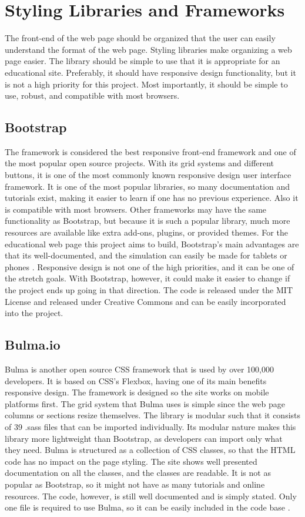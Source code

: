 \documentclass[capstone.tex]{subfiles}
\begin{document}
\section{Styling Libraries and Frameworks}
The front-end of the web page should be organized that the user can easily understand the format of the web page. Styling libraries make organizing a web page easier. The library should be simple to use that it is appropriate for an educational site. Preferably, it should have responsive design functionality, but it is not a high priority for this project. Most importantly, it should be simple to use, robust, and compatible with most browsers.

\subsection{Bootstrap}
The framework is considered the best responsive front-end framework and one of the most popular open source projects. With its grid systems and different buttons, it is one of the most commonly known responsive design user interface framework.  It is one of the most popular libraries, so many documentation and tutorials exist, making it easier to learn if one has no previous experience. Also it is compatible with most browsers. Other frameworks may have the same functionality as Bootstrap, but because it is such a popular library, much more resources are available like extra add-ons, plugins, or provided themes. For the educational web page this project aims to build, Bootstrap's main advantages are that its well-documented, and the simulation can easily be made for tablets or phones \cite{bootstrap}. Responsive design is not one of the high priorities, and it can be one of the stretch goals. With Bootstrap, however, it could make it easier to change if the project ends up going in that direction. 
The code is released under the MIT License and released under Creative Commons and can be easily incorporated into the project.

\subsection{Bulma.io}
Bulma is another open source CSS framework that is used by over 100,000 developers. It is based on CSS's Flexbox, having one of its main benefits responsive design. The framework is designed so the site works on mobile platforms first.
The grid system that Bulma uses is simple since the web page columns or sections resize themselves. 
The library is modular such that it consists of 39 .sass files that can be imported individually. Its modular nature makes this library more lightweight than Bootstrap, as developers can import only what they need. 
Bulma is structured as a collection of CSS classes, so that the HTML code has no impact on the page styling. The site shows well presented documentation on all the classes, and the classes are readable. 
It is not as popular as Bootstrap, so it might not have as many tutorials and online resources. 
The code, however, is still well documented and is simply stated. 
Only one file is required to use Bulma, so it can be easily included in the code base \cite{bulma}. 
\end{document}
